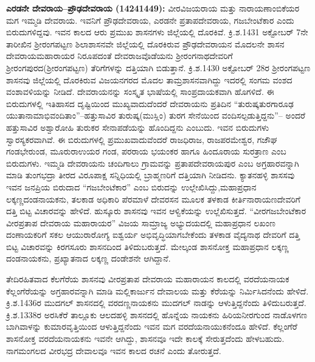 \textbf{ಎರಡನೇ ದೇವರಾಯ–ಪ್ರೌಢದೇವರಾಯ (14241449): } ವೀರವಿಜಯರಾಯ ಮತ್ತು ನಾರಾಯಣಾಂಬಿಕೆಯರ ಮಗ ಇಮ್ಮಡಿ ದೇವರಾಯ. ಇವನಿಗೆ ಪ್ರೌಢದೇವರಾಯ, ಎರಡನೇ ಪ್ರತಾಪದೇವರಾಯ, ಗಜಬೇಂಟೆಕಾರ ಎಂದು ಬಿರುದುಗಳಿದ್ದವು. ಇವನ ಕಾಲದ ಆರು ಪ್ರಮುಖ ಶಾಸನಗಳು ಜಿಲ್ಲೆಯಲ್ಲಿ ದೊರಕಿವೆ. ಕ್ರಿ.ಶ.1431 ಅಕ್ಟೋಬರ್​ 7ನೇ ತಾರೀಖಿನ ಶ‍್ರೀರಂಗಪಟ್ಟಣ ಶಿಲಾಶಾಸನವೇ ಜಿಲ್ಲೆಯಲ್ಲಿ ದೊರಕಿರುವ ಪ್ರೌಢದೇವರಾಯನ ಮೊದಲನೇ ಶಾಸನ ದೇವರಾಯಮಹಾರಾಯರ ನಿರೂಪದಂತೆ ದೇವರಾಜವೊಡೆಯನು ಶ‍್ರೀರಂಗನಾಥದೇವರಿಗೆ ಶ‍್ರೀರಂಗಪುರದ(ಶ‍್ರೀರಂಗಪಟ್ಟಣ) ತೆರಿಗೆಗಳನ್ನು ದತ್ತಿಯಾಗಿ ಬಿಡುತ್ತಾನೆ. ಕ್ರಿ.ಶ.1430 ಅಕ್ಟೋಬರ್​ 28ರ ಶ‍್ರೀರಂಗಪಟ್ಟಣ ಶಾಸನವು ಜಿಲ್ಲೆಯಲ್ಲಿ ದೊರಕಿರುವ ವಿಜಯನಗರದ ಮೊದಲ ತಾಮ್ರಶಾಸನವಾಗಿದ್ದು ಇದರಲ್ಲಿ ಸಂಗಮ ವಂಶದ ವಂಶಾವಳಿಯನ್ನು ನೀಡಿದೆ. ದೇವರಾಯನನ್ನು ಸಂಸ್ಕೃತ ಭಾಷೆಯಲ್ಲಿ ಸಾಂಪ್ರದಾಯಕವಾಗಿ ಹೊಗಳಿದೆ. ಈ ಬಿರುದುಗಳಲ್ಲಿ ಇತಿಹಾಸದ ದೃಷ್ಟಿಯಿಂದ ಮುಖ್ಯವಾದುದೆಂದರೆ ದೇವರಾಯನು ಪ್ರತಿದಿನ “ತುರುಷ್ಕತುರಗಾರೂಢ ಯುತಾನಾಮಾಭಿವಂದಿತಾಂ”–ಹತ್ತುಸಾವಿರ ತುರುಷ್ಕ(ಮುಸ್ಲಿಂ) ತುರಗ ಸೇನೆಯಿಂದ ವಂದಿಸಲ್ಪಡುತ್ತಿದ್ದನು”– ಅಂದರೆ ಹತ್ತುಸಾವಿರ ಅಶ್ವಾರೋಹಿ ತುರುಕರ ಸೇನಾಪಡೆಯನ್ನು ಹೊಂದಿದ್ದನು ಎಂಬುದು. ಇವನ ಬಿರುದುಗಳು ಸ್ವಾರಸ್ಯಕರವಾಗಿವೆ. ಈ ಬಿರುದುಗಳಲ್ಲಿ ಪ್ರಮುಖವಾದುವೆಂದರೆ ರಾಜಧಿರಾಜ, ರಾಜಪರಮೇಶ್ವರ, ಗಜೌಘ ಗಂಡಭೇರುಂಡ, ಮೂರುರಾಉಯರ ಗಂಡ, ಪರರಾಯ ಭಯಂಕರ ಹಾಗೂ ಹಿಂದೂರಾಯ ಸುರತ್ರಾಣ ಎಂಬ ಬಿರುದುಗಳು. ಇಮ್ಮಡಿ ದೇವರಾಯನು ಚಂದಿಗಾಲು ಗ್ರಾಮವನ್ನು ಪ್ರತಾಪದೇವರಾಯಪುರ ಎಂಬ ಅಗ್ರಹಾರವನ್ನಾಗಿ ಮಾಡಿ ತುಂಗಭದ್ರಾ ತೀರದ ವಿರೂಪಾಕ್ಷ ಸನ್ನಿಧಿಯಲ್ಲಿ ಬ್ರಾಹ್ಮಣರಿಗೆ ದತ್ತಿಯಾಗಿ ನೀಡಿದನು. ಕ್ಯಾತನಹಳ್ಳಿ ಶಾಸಸವು ಇವನ ಜನಪ್ರಿಯ ಬಿರುದಾದ “ಗಜಬೇಂಟೆಕಾರ” ಎಂಬ ಬಿರುದನ್ನು ಉಲ್ಲೇಖಿಸಿದ್ದು,ಮಹಾಪ್ರಧಾನ ಲಕ್ಕಣ್ಣದಂಡನಾಯಕನು, ತಲಕಾಡ ಅಧಿಕಾರಿ ಪೆರಮಾಳೆ ದೇವರಸನ ಮೂಲಕ ತಳಕಾಡ ಕೀರ್ತಿನಾರಾಯಣದೇವರಿಗೆ ದತ್ತಿ ಬಿಟ್ಟ ವಿಚಾರವನ್ನು ಹೇಳಿದೆ. ಹುಸ್ಕೂರು ಶಾಸನವು ಇವನ ಆಳ್ವಿಕೆಯನ್ನು ಉಲ್ಲೆಖಿಸುತ್ತದೆ. “ವೀರಗಜಬೇಂಟೆಕಾರ ವೀರಪ್ರತಾಪ ದೇವರಾಯ ಮಹಾರಾಯರ” ವಿಜಯ ಸಾಮ್ರಾಜ್ಯ ಅಭ್ಯುದಯದಲ್ಲಿ ಮಹಾಪ್ರಧಾನ ಲಖಂಣ ದಂಣಾಯಕರಿಗೆ ಸಕಲ ಆಯುರಾರೋಗ್ಯ ಐಶ್ವರ್ಯ ಅಭಿವೃದ್ಧಿಯಾಗಬೇಕೆಂದು ತಳಕಾಡ ವೈದ್ಯನಾಥ ದೇವರಿಗೆ ದತ್ತಿ ಬಿಟ್ಟ ವಿಚಾರವನ್ನು ಕಿರಗಸೂರು ಶಾಸನದಿಂದ ತಿಳಿದುಬರುತ್ತದೆ. ಮೇಲ್ಕಂಡ ಶಾಸನೋಕ್ತ ಮಹಾಪ್ರಧಾನ ಲಕ್ಕಣ್ಣ ದಂಡನಾಯಕನು, ಪ್ರಖ್ಯಾತನಾದ ಲಕ್ಕಣ್ಣ ದಂಡೇಶನೇ ಆಗಿದ್ದಾನೆ. 

ತೇದಿರಹಿತವಾದ ಕೆಲಗೆರೆಯ ಶಾಸನವು ವೀರಪ್ರತಾಪ ದೇವರಾಯ ಮಹಾರಾಯನ ಕಾಲದಲ್ಲಿ ವರದೆಯನಾಯಕ ಕೆಲ್ಲಂಗೆರೆಯನ್ನು ಅಗ್ರಹಾರವನ್ನಾಗಿ ಮಾಡಿ ಮಲ್ಲಿಕಾರ್ಜುನ ದೇವಾಲಯ ಮತ್ತು ಕೆರೆಯನ್ನು ನಿರ್ಮಿಸಿದನೆಂದು ಹೇಳಿದೆ. ಕ್ರಿ.ಶ.1436ರ ಮುದಗಲ್​ ಶಾಸನದಲ್ಲಿ ವರದಣ್ಣನಾಯಕನು ಮುದಗಲ್​ ನಾಡನ್ನು ಆಳುತ್ತಿದ್ದನೆಂದು ತಿಳಿದುಬರುತ್ತದೆ. ಕ್ರಿ.ಶ.1338ರ ಅರಸಿಕೆರೆ ತಾಲ್ಲೂಕು ಆಲದಹಳ್ಳಿ ಶಾಸನದಲ್ಲಿ ಹೊನ್ನೆಯ ನಾಯಕನು ಹಿರಿಯನೀರಗುಂದ ನಾಡೊಳಗಣ ಬಾಗಿವಾಳನ್ನು ಕುಮಾರವೃತ್ತಿಯಿಂದ ಆಳುತ್ತಿದ್ದನೆಂದು ಇವನ ಮಗ ವರದೆಯನಾಯುಕನೆಂದೂ ಹೇಳಿದೆ. ಕೆಲ್ಲಂಗೆರೆ ಶಾಸನೋಕ್ತ ವರದೆಯನಾಯಕನು ಇವನೇ ಆಗಿದ್ದು, ಶಾಸನವೂ ಇದೇ ಕಾಲಕ್ಕೆ ಸೇರುತ್ತದೆಂದು ಹೇಳಬಹುದು. ನಾಗಮಂಗಲದ ವೀರಭದ್ರ ದೇವಾಲವೂ ಇವನ ಕಾಲದ ರಚನೆ ಎಂದು ತೋರುತ್ತದೆ.

